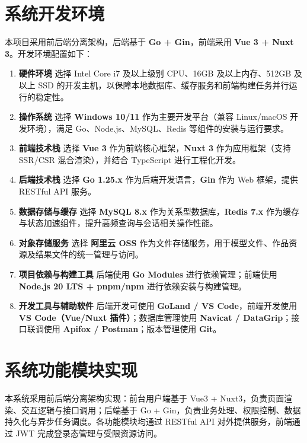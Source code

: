 \documentclass[twoside]{thesis-cls-Miya} %
\begin{document}
\section{系统开发环境}

本项目采用前后端分离架构，后端基于 \textbf{Go + Gin}，前端采用 \textbf{Vue 3 + Nuxt 3}。开发环境配置如下：

\begin{enumerate}[label=(\arabic*)]
	\item \textbf{硬件环境} 选择 Intel Core i7 及以上级别 CPU、16GB 及以上内存、512GB 及以上 SSD 的开发主机，以保障本地数据库、缓存服务和前端构建任务并行运行的稳定性。
	\item \textbf{操作系统} 选择 \textbf{Windows 10/11} 作为主要开发平台（兼容 Linux/macOS 开发环境），满足 Go、Node.js、MySQL、Redis 等组件的安装与运行要求。
	\item \textbf{前端技术栈} 选择 \textbf{Vue 3} 作为前端核心框架，\textbf{Nuxt 3} 作为应用框架（支持 SSR/CSR 混合渲染），并结合 TypeScript 进行工程化开发。
	\item \textbf{后端技术栈} 选择 \textbf{Go 1.25.x} 作为后端开发语言，\textbf{Gin} 作为 Web 框架，提供 RESTful API 服务\cite{fielding2000rest}。
	\item \textbf{数据存储与缓存} 选择 \textbf{MySQL 8.x} 作为关系型数据库，\textbf{Redis 7.x} 作为缓存与状态加速组件，提升高频查询与会话相关操作性能。
	\item \textbf{对象存储服务} 选择 \textbf{阿里云 OSS} 作为文件存储服务，用于模型文件、作品资源及结果文件的统一管理与访问。
	\item \textbf{项目依赖与构建工具} 后端使用 \textbf{Go Modules} 进行依赖管理；前端使用 \textbf{Node.js 20 LTS + pnpm/npm} 进行依赖安装与构建管理。
	\item \textbf{开发工具与辅助软件} 后端开发可使用 \textbf{GoLand / VS Code}，前端开发使用 \textbf{VS Code（Vue/Nuxt 插件）}；数据库管理使用 \textbf{Navicat / DataGrip}；接口联调使用 \textbf{Apifox / Postman}；版本管理使用 \textbf{Git}。
\end{enumerate}

\section{系统功能模块实现}

本系统采用前后端分离架构实现：前台用户端基于 Vue3 + Nuxt3，负责页面渲染、交互逻辑与接口调用；后端基于 Go + Gin，负责业务处理、权限控制、数据持久化与异步任务调度。各功能模块均通过 RESTful API 对外提供服务，前端通过 JWT 完成登录态管理与受限资源访问。
\end{document}
